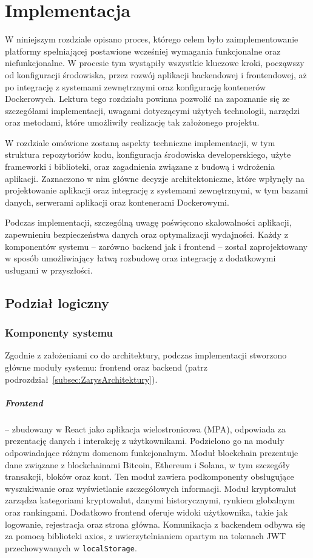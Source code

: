 \chapter{Implementacja}
W niniejszym rozdziale opisano proces, którego celem było zaimplementowanie platformy spełniającej postawione wcześniej wymagania funkcjonalne oraz niefunkcjonalne. 
W procesie tym wystąpiły wszystkie kluczowe kroki, począwszy od konfiguracji środowiska, przez rozwój aplikacji backendowej i frontendowej, aż po integrację z systemami zewnętrznymi oraz konfigurację kontenerów Dockerowych. Lektura tego rozdziału powinna pozwolić na zapoznanie się ze szczegółami implementacji, uwagami dotyczącymi użytych technologii, narzędzi oraz metodami, które umożliwiły realizację tak założonego projektu.

W rozdziale omówione zostaną aspekty techniczne implementacji, w tym struktura repozytoriów kodu, konfiguracja środowiska developerskiego, użyte frameworki i biblioteki, oraz zagadnienia związane z budową i wdrożenia aplikacji. Zaznaczono w nim główne decyzje architektoniczne, które wpłynęły na projektowanie aplikacji oraz integrację z systemami zewnętrznymi, w tym bazami danych, serwerami aplikacji oraz kontenerami Dockerowymi.

Podczas implementacji, szczególną uwagę poświęcono skalowalności aplikacji, zapewnieniu bezpieczeństwa danych oraz optymalizacji wydajności. Każdy z komponentów systemu – zarówno backend jak i frontend – został zaprojektowany w sposób umożliwiający łatwą rozbudowę oraz integrację z dodatkowymi usługami w przyszłości.


\section{Podział logiczny}
\subsection{Komponenty systemu}
Zgodnie z założeniami co do architektury, podczas implementacji stworzono główne moduły systemu: frontend oraz backend (patrz podrozdział~\ref{subsec:ZarysArchitektury}).

\paragraph{Frontend} -- zbudowany w React jako aplikacja wielostronicowa (MPA), odpowiada za prezentację danych i interakcję z użytkownikami. Podzielono go na moduły odpowiadające różnym domenom funkcjonalnym. Moduł blockchain prezentuje dane związane z blockchainami Bitcoin, Ethereum i Solana, w tym szczegóły transakcji, bloków oraz kont. Ten moduł zawiera podkomponenty obsługujące wyszukiwanie oraz wyświetlanie szczegółowych informacji. Moduł kryptowalut zarządza kategoriami kryptowalut, danymi historycznymi, rynkiem globalnym oraz rankingami. Dodatkowo frontend oferuje widoki użytkownika, takie jak logowanie, rejestracja oraz strona główna. Komunikacja z backendem odbywa się za pomocą biblioteki axios, z uwierzytelnianiem opartym na tokenach JWT przechowywanych w \texttt{localStorage}.

